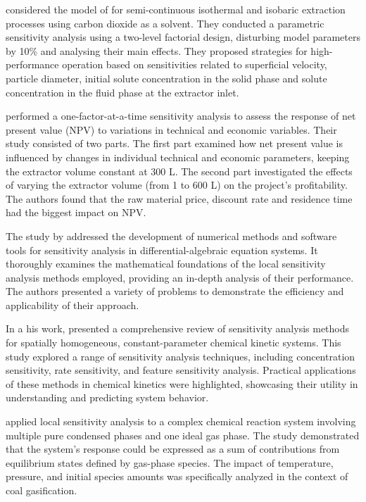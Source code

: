 \documentclass[a4paper,fleqn]{cas-dc}
\begin{document}
	\citet{Santos2000} considered the model of \citet{Sovova1994} for semi-continuous isothermal and isobaric extraction processes using carbon dioxide as a solvent. They conducted a parametric sensitivity analysis using a two-level factorial design, disturbing model parameters by 10\% and analysing their main effects. They proposed strategies for high-performance operation based on sensitivities related to superficial velocity, particle diameter, initial solute concentration in the solid phase and solute concentration in the fluid phase at the extractor inlet.
	
	\citet{Hatami2024} performed a one-factor-at-a-time sensitivity analysis to assess the response of net present value (NPV) to variations in technical and economic variables. Their study consisted of two parts. The first part examined how net present value is influenced by changes in individual technical and economic parameters, keeping the extractor volume constant at 300 L. The second part investigated the effects of varying the extractor volume (from 1 to 600 L) on the project's profitability. The authors found that the raw material price, discount rate and residence time had the biggest impact on NPV.
	
	The study by \citet{Maly1996} addressed the development of numerical methods and software tools for sensitivity analysis in differential-algebraic equation systems. It thoroughly examines the mathematical foundations of the local sensitivity analysis methods employed, providing an in-depth analysis of their performance. The authors presented a variety of problems to demonstrate the efficiency and applicability of their approach.
		
	In a his work, \citet{Turanyi1990} presented a comprehensive review of sensitivity analysis methods for spatially homogeneous, constant-parameter chemical kinetic systems. This study explored a range of sensitivity analysis techniques, including concentration sensitivity, rate sensitivity, and feature sensitivity analysis. Practical applications of these methods in chemical kinetics were highlighted, showcasing their utility in understanding and predicting system behavior.
		
	\citet{Fishtik1997} applied local sensitivity analysis to a complex chemical reaction system involving multiple pure condensed phases and one ideal gas phase. The study demonstrated that the system's response could be expressed as a sum of contributions from equilibrium states defined by gas-phase species. The impact of temperature, pressure, and initial species amounts was specifically analyzed in the context of coal gasification.
		
\end{document}
